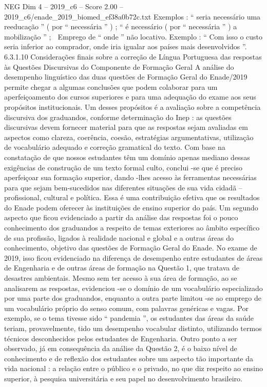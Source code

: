 \begin{textsample}{NEG Dim 4 – 2019\_c6 – Score 2.00 – 2019\_c6/enade\_2019\_biomed\_ef38a0b72c.txt}
Exemplos : “ seria necessário uma reeducação ” ( por “ necessária ” ) ; “ é necessário ( por “ necessária ” ) a mobilização ” ;  Emprego de “ onde ” não locativo.
Exemplo : “ Com isso o custo seria inferior ao comprador, onde iria igualar aos países mais desenvolvidos ”. 6.3.1.10 Considerações finais sobre a correção de Língua Portuguesa das respostas às Questões Discursivas do Componente de Formação Geral A análise do desempenho linguístico das duas questões de Formação Geral do Enade/2019 permite chegar a algumas conclusões que podem colaborar para um aperfeiçoamento dos cursos superiores e para uma adequação do exame aos seus propósitos institucionais.
Um desses propósitos é a avaliação sobre a competência discursiva dos graduandos, conforme determinação do Inep : as questões discursivas devem fornecer material para que as respostas sejam avaliadas em aspectos como clareza, coerência, coesão, estratégias argumentativas, utilização de vocabulário adequado e correção gramatical do texto.
Com base na constatação de que nossos estudantes têm um domínio apenas mediano dessas exigências de construção de um texto formal culto, conclui -se que é preciso aperfeiçoar sua formação superior, dando -lhes acesso às ferramentas necessárias para que sejam bem-sucedidos nas diferentes situações de sua vida cidadã – profissional, cultural e política.
Essa é uma contribuição efetiva que os resultados do Enade podem oferecer às instituições de ensino superior do país.
Um segundo aspecto que ficou evidenciado a partir da análise das respostas foi o pouco conhecimento dos graduandos a respeito de temas exteriores ao âmbito específico de sua profissão, ligados à realidade nacional e global e a outras áreas do conhecimento, objetivo das questões de Formação Geral do Enade.
No exame de 2019, isso ficou evidenciado na diferença de desempenho entre estudantes de áreas de Engenharia e de outras áreas de formação na Questão 1, que tratava de desastres ambientais.
Mesmo sem ter acesso à sua área de formação, ao se analisarem as respostas, evidenciou -se o domínio de um vocabulário especializado por uma parte dos graduandos, enquanto a outra parte limitou -se ao emprego de um vocabulário próprio do senso comum, com palavras genéricas e vagas.
Por exemplo, se o tema tivesse sido “ pandemia ”, os estudantes das áreas da saúde teriam, provavelmente, tido um desempenho vocabular distinto, utilizando termos técnicos desconhecidos pelos estudantes de Engenharia.
Outro ponto a ser observado, já em consequência da análise da Questão 2, é o baixo nível de conhecimento e de reflexão dos estudantes sobre um aspecto tão importante da vida nacional : a relação entre o público e o privado, no que diz respeito ao ensino superior, à pesquisa universitária e seu papel no desenvolvimento brasileiro.

\end{textsample}
